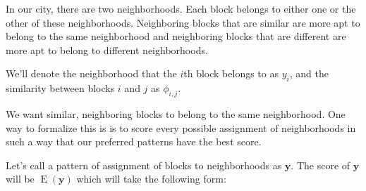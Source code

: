\documentclass[12pt,draft,letter]{article}
\begin{document}
\begin{figure}
\centering
{}
\end{figure}

\begin{figure}
\centering


\end{figure}

In our city, there are two neighborhoods. Each block belongs to either
one or the other of these neighborhoods. Neighboring blocks that are
similar are more apt to belong to the same neighborhood and
neighboring blocks that are different are more apt to belong to
different neighborhoods.

We'll denote the neighborhood that the $i$th block belongs to as
$y_i$, and the similarity between blocks $i$ and $j$ as $\phi_{i,j}$.

\begin{figure}[!h]
\centering


\end{figure}

We want similar, neighboring blocks to belong to the same
neighborhood. One way to formalize this is is to score every possible
assignment of neighborhoods in such a way that our preferred patterns
have the best score.

Let's call a pattern of assignment of blocks to neighborhoods as
$\mathbf{y}$.  The score of $\mathbf{y}$ will be
$\operatorname{E}(\mathbf{y})$ which will take the following form:
\end{document}
